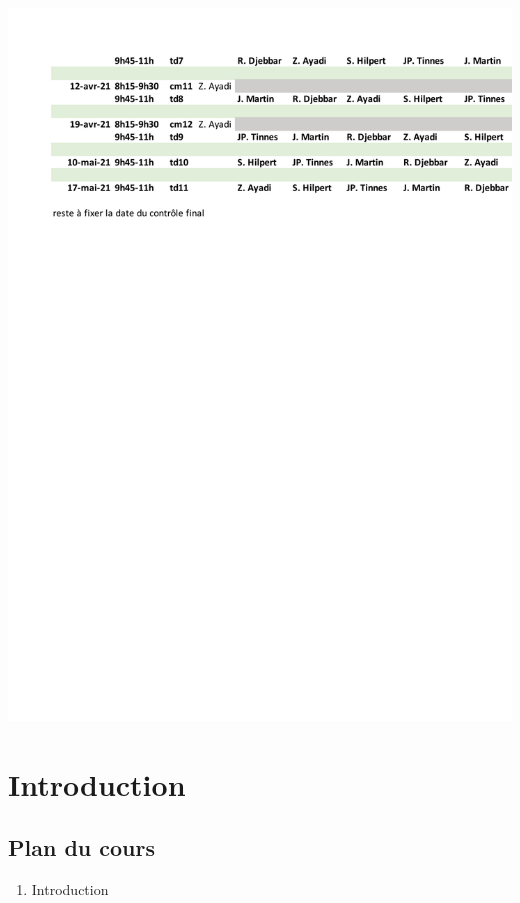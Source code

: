 \documentclass[
]{book}
\providecommand{\tightlist}{%
  \setlength{\itemsep}{0pt}\setlength{\parskip}{0pt}}
\begin{document}
\begin{center}\includegraphics[width=600pt]{Figures/Organization-02} \end{center}

\hypertarget{introduction}{%
\chapter*{Introduction}\label{introduction}}

\hypertarget{plan-du-cours}{%
\section*{Plan du cours}\label{plan-du-cours}}

\begin{enumerate}
\def\labelenumi{\arabic{enumi}.}
\tightlist
\item
  Introduction
\end{enumerate}
\end{document}
